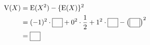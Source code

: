 $\begin{aligned}[t]\mathrm{V}(X)&=\mathrm{E}(X^2)-\{\mathrm{E}(X)\}^2\\ &=(-1)^2\cdot\blank+0^2\cdot\dfrac{1}{2}+1^2\cdot\blank-\left(\blank\right)^{2}\\ &=\blank\end{aligned}$
